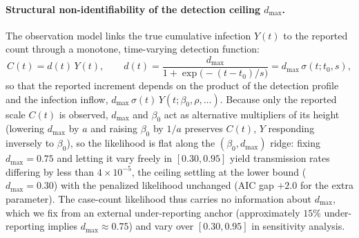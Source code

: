 \documentclass[preprint,12pt,numbers]{elsarticle}
\begin{document}
\paragraph{Structural non-identifiability of the detection ceiling
$d_{\max}$.}
The observation model links the true cumulative infection $Y(t)$ to the
reported count through a monotone, time-varying detection function:
\begin{equation}
C(t)=d(t)\,Y(t),\qquad
d(t)=\frac{d_{\max}}{1+\exp\!\big(-(t-t_{0})/s\big)}
=d_{\max}\,\sigma(t;t_0,s),
\label{eq:ident-obs}
\end{equation}
so that the reported increment depends on the product of the
detection profile and the infection inflow,
$d_{\max}\,\sigma(t)\,Y(t;\beta_{0},\rho,\ldots)$. Because only the
reported scale $C(t)$ is observed, $d_{\max}$ and $\beta_0$ act as
alternative multipliers of its height (lowering $d_{\max}$ by $a$ and
raising $\beta_0$ by $1/a$ preserves $C(t)$, $Y$ responding inversely to
$\beta_0$), so the likelihood is flat along the $(\beta_0,d_{\max})$
ridge: fixing $d_{\max}=0.75$ and letting it vary freely in
$[0.30,0.95]$ yield transmission rates differing by less than
$4\times10^{-5}$, the ceiling settling at the lower bound
($d_{\max}=0.30$) with the penalized likelihood unchanged (AIC gap
$+2.0$ for the extra parameter). The case-count likelihood thus carries no
information about $d_{\max}$, which we fix from an external
under-reporting anchor (approximately $15\%$ under-reporting implies
$d_{\max}\approx0.75$) and vary over $[0.30,0.95]$ in sensitivity
analysis.
\end{document}
